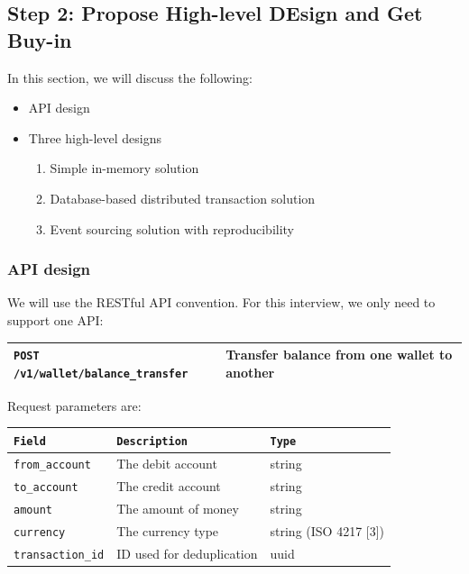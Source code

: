 \documentclass{report}
\theoremstyle{definition}
\let\oldsubsection\subsection
\let\oldsubsubsection\subsubsection
\renewcommand{\subsection}{\oldsubsection*}
\renewcommand{\subsubsection}{\oldsubsubsection*}
\begin{document}
\subsection{Step 2: Propose High-level DEsign and Get Buy-in}

In this section, we will discuss the following:

\begin{itemize}
\item
API design
\item
Three high-level designs

\begin{enumerate}
\item
Simple in-memory solution
\item
Database-based distributed transaction solution
\item
Event sourcing solution with reproducibility
\end{enumerate}
\end{itemize}

\subsubsection{API design}

We will use the RESTful API convention. For this interview, we only need to support one API:

\begin{tabular}{|p{6cm}|p{6cm}|}
\hline
\lstinline|POST /v1/wallet/balance_transfer| & Transfer balance from one wallet to another \\
\hline
\end{tabular}

Request parameters are:

\begin{tabular}{|p{4cm}|p{4cm}|p{4cm}|}
\hline
\lstinline|Field| & \lstinline|Description|  & \lstinline|Type| \\
\hline
\lstinline|from_account| & The debit account  & string \\
\hline
\lstinline|to_account| & The credit account  & string \\
\hline
\lstinline|amount| & The amount of money  & string \\
\hline
\lstinline|currency| & The currency type & string (ISO 4217 [3]) \\
\hline
\lstinline|transaction_id| & ID used for deduplication & uuid \\
\hline
\end{tabular}
\end{document}
